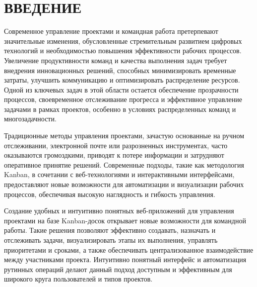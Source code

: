 \section*{ВВЕДЕНИЕ}

Современное управление проектами и командная работа претерпевают значительные изменения, обусловленные стремительным развитием цифровых технологий и необходимостью повышения эффективности рабочих процессов. Увеличение продуктивности команд и качества выполнения задач требует внедрения инновационных решений, способных минимизировать временные затраты, улучшить коммуникацию и оптимизировать распределение ресурсов. Одной из ключевых задач в этой области остается обеспечение прозрачности процессов, своевременное отслеживание прогресса и эффективное управление задачами в рамках проектов, особенно в условиях распределенных команд и многозадачности.

Традиционные методы управления проектами, зачастую основанные на ручном отслеживании, электронной почте или разрозненных инструментах, часто оказываются громоздкими, приводят к потере информации и затрудняют оперативное принятие решений. Современные подходы, такие как методология Kanban, в сочетании с веб-технологиями и интерактивными интерфейсами, предоставляют новые возможности для автоматизации и визуализации рабочих процессов, обеспечивая высокую наглядность и гибкость управления.

Создание удобных и интуитивно понятных веб-приложений для управления проектами на базе Kanban-досок открывает новые возможности для командной работы. Такие решения позволяют эффективно создавать, назначать и отслеживать задачи, визуализировать этапы их выполнения, управлять приоритетами и сроками, а также обеспечивать централизованное взаимодействие между участниками проекта. Интуитивно понятный интерфейс и автоматизация рутинных операций делают данный подход доступным и эффективным для широкого круга пользователей и типов проектов.

